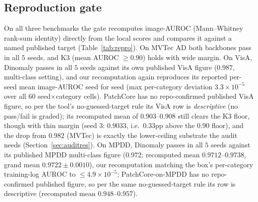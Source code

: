\documentclass[11pt]{article}
\begin{document}
\subsection{Reproduction gate}
\label{sec:repro}

On all three benchmarks the gate recomputes image-AUROC (Mann--Whitney rank-sum identity) directly
from the local scores and compares it against a named published target (Table~\ref{tab:repro}).
On MVTec AD both backbones pass in all $5$ seeds, and K3 (mean AUROC $\ge 0.90$) holds with wide
margin. On VisA, Dinomaly passes in all $5$ seeds against its own published VisA figure
($0.987$, multi-class setting), and our recomputation again reproduces its reported per-seed
mean image-AUROC seed for seed (max per-category deviation $3.3\times 10^{-5}$ over
all $60$ seed$\times$category cells). PatchCore has no repo-confirmed published VisA figure, so
per the tool's no-guessed-target rule its VisA row is \emph{descriptive} (no pass/fail is
graded); its recomputed mean of $0.903$--$0.908$ still clears the K3 floor, though with thin
margin (seed $3$: $0.9033$, i.e.\ $0.33$pp above the $0.90$ floor), and the drop from $0.982$
(MVTec) is exactly the lower-ceiling substrate the audit needs (Section~\ref{sec:auditres}). On
MPDD, Dinomaly passes in all $5$ seeds against its published MPDD multi-class figure ($0.972$;
recomputed mean $0.9712$--$0.9738$, grand mean $0.9722 \pm 0.0010$), our recomputation matching
the box's per-category training-log AUROC to $\le 4.9\times10^{-5}$; PatchCore-on-MPDD has no
repo-confirmed published figure, so per the same no-guessed-target rule its row is
descriptive (recomputed mean $0.948$--$0.957$).
\end{document}
